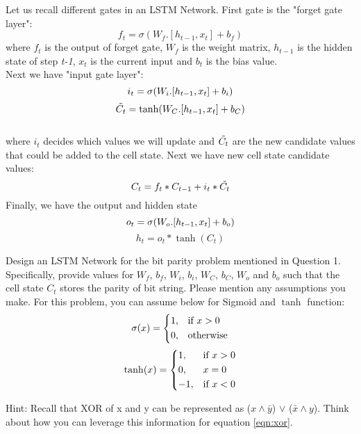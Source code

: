 Let us recall different gates in an LSTM Network. First gate is the "forget gate layer":\\
\begin{equation}
    f_t = \sigma (W_f.[h_{t-1}, x_t] + b_f)
\end{equation}
where $f_t$ is the output of forget gate, $W_f$ is the weight matrix, $h_{t-1}$ is the hidden state of step \textit{t-1}, $x_t$ is the current input and $b_t$ is the bias value. \\
Next we have "input gate layer":\\
\begin{equation}
    i_t = \sigma (W_i.[h_{t-1}, x_t] + b_i) \\
\end{equation}
\begin{equation}
    \Tilde{C_{t}} = \tanh (W_C.[h_{t-1}, x_t] + b_C) 
\end{equation} \\
where $i_t$ decides which values we will update and $\Tilde{C_{t}}$ are the new candidate values that could be added to the cell state. Next we have new cell state candidate values:
\begin{equation}
    C_t = f_t * C_{t-1} + i_t * \Tilde{C_{t}} 
    \label{eqn:xor}
\end{equation}
Finally, we have the output and hidden state
\begin{equation}
   o_t = \sigma (W_o .[h_{t-1}, x_t] + b_o) \\
\end{equation}
\begin{equation}
    h_t = o_t * \tanh(C_t)
\end{equation}

Design an LSTM Network for the bit parity problem mentioned in Question 1. Specifically, provide values for $W_f$, $b_f$, $W_i$, $b_i$, $W_C$, $b_C$, $W_o$ and $b_o$ such that the cell state $C_t$ stores the parity of bit string. Please mention any assumptions you make. For this problem, you can assume below for Sigmoid and $\tanh$ function: \\
\begin{equation}
    \sigma(x) = \begin{dcases}
    1,& \text{if } x > 0\\
    0,              & \text{otherwise}
\end{dcases}
\end{equation}
\begin{equation}
    \tanh(x) = \begin{dcases}
    1,& \text{if } x > 0\\
    0,              & x = 0\\
    -1,& \text{if } x < 0
\end{dcases}
\end{equation}


Hint: Recall that XOR of x and y can be represented as ($x\land \bar{y}$) $\lor$ ($\bar{x} \land y$). Think about how you can leverage this information for equation \eqref{eqn:xor}.